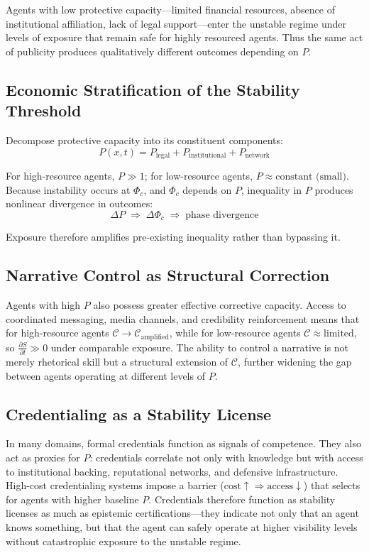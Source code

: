 \documentclass[12pt,a4paper]{article}
\begin{document}
Agents with low protective capacity---limited financial resources, absence of institutional affiliation, lack of legal support---enter the unstable regime under levels of exposure that remain safe for highly resourced agents. Thus the same act of publicity produces qualitatively different outcomes depending on $P$.

\subsection{Economic Stratification of the Stability Threshold}

Decompose protective capacity into its constituent components:
\[
P(x,t) = P_{\text{legal}} + P_{\text{institutional}} + P_{\text{network}}
\]

For high-resource agents, $P \gg 1$; for low-resource agents, $P \approx \text{constant (small)}$. Because instability occurs at $\Phi_c$, and $\Phi_c$ depends on $P$, inequality in $P$ produces nonlinear divergence in outcomes:
\[
\Delta P \;\Rightarrow\; \Delta \Phi_c \;\Rightarrow\; \text{phase divergence}
\]

Exposure therefore amplifies pre-existing inequality rather than bypassing it.

\subsection{Narrative Control as Structural Correction}

Agents with high $P$ also possess greater effective corrective capacity. Access to coordinated messaging, media channels, and credibility reinforcement means that for high-resource agents $\mathcal{C} \rightarrow \mathcal{C}_{\text{amplified}}$, while for low-resource agents $\mathcal{C} \approx \text{limited}$, so $\frac{\partial S}{\partial t} \gg 0$ under comparable exposure. The ability to control a narrative is not merely rhetorical skill but a structural extension of $\mathcal{C}$, further widening the gap between agents operating at different levels of $P$.

\subsection{Credentialing as a Stability License}

In many domains, formal credentials function as signals of competence. They also act as proxies for $P$: credentials correlate not only with knowledge but with access to institutional backing, reputational networks, and defensive infrastructure. High-cost credentialing systems impose a barrier ($\text{cost} \uparrow \Rightarrow \text{access} \downarrow$) that selects for agents with higher baseline $P$. Credentials therefore function as stability licenses as much as epistemic certifications---they indicate not only that an agent knows something, but that the agent can safely operate at higher visibility levels without catastrophic exposure to the unstable regime.
\end{document}
